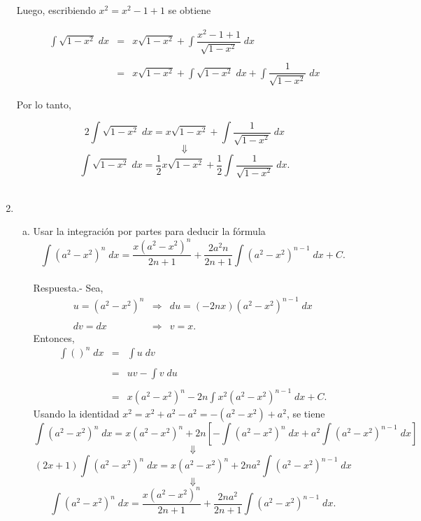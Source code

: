 \begin{enumerate}[\bfseries 1.]
	Luego, escribiendo $x^2=x^2-1+1$ se obtiene

	$$
	\begin{array}{rcl}
	    \displaystyle\int \sqrt{1-x^2}\; dx &=& x\sqrt{1-x^2} + \displaystyle\int \dfrac{x^2-1+1}{\sqrt{1-x^2}}\; dx\\\\
						&=& x\sqrt{1-x^2} + \displaystyle\int \sqrt{1-x^2}\; dx + \int \dfrac{1}{\sqrt{1-x^2}}\; dx
	\end{array}
	$$

	Por lo tanto,

	$$2\displaystyle\int \sqrt{1-x^2}\; dx = x\sqrt{1-x^2} + \int \dfrac{1}{\sqrt{1-x^2}}\; dx$$ 
	$$\Downarrow$$  
	$$\int \sqrt{1-x^2}\; dx = \dfrac{1}{2}x\sqrt{1-x^2}+\dfrac{1}{2}\int \dfrac{1}{\sqrt{1-x^2}}\; dx.$$\\

    \item 
	\begin{enumerate}[a)]

	    \item Usar la integración por partes para deducir la fórmula
	    $$\int \left(a^2-x^2\right)^n \; dx = \dfrac{x\left(a^2-x^2\right)^n}{2n+1}+\dfrac{2a^2n}{2n+1}\int \left(a^2-x^2\right)^{n-1}\; dx + C.$$\\
		Respuesta.-\; Sea,
		$$
		\begin{array}{rcl}
		    u=\left(a^2-x^2\right)^n &\Rightarrow& du=(-2nx)\left(a^2-x^2\right)^{n-1}\; dx\\\\
		    dv=dx &\Rightarrow& v=x.
		\end{array}
		$$
		Entonces,
		$$
		\begin{array}{rcl}
		    \displaystyle\int \left(\right)^n\; dx &=& \displaystyle\int u\; dv\\\\
							   &=& uv - \int v\; du\\\\
							   &=& x\left(a^2-x^2\right)^n - 2n\displaystyle\int x^2\left(a^2-x^2\right)^{n-1}\; dx+C.
		\end{array}
		$$
		Usando la identidad $x^2=x^2+a^2-a^2 = -\left(a^2-x^2\right)+a^2$, se tiene
		$$\int \left(a^2-x^2\right)^n\; dx = x\left(a^2-x^2\right)^n+2n\left[-\int \left(a^2-x^2\right)^n\; dx+a^2\int\left(a^2-x^2\right)^{n-1}\; dx\right]$$
		$$\Downarrow$$
		$$(2x+1)\int \left(a^2-x^2\right)^n\; dx = x\left(a^2-x^2\right)^n + 2na^2\int \left(a^2-x^2\right)^{n-1}\; dx$$
		$$\Downarrow$$
		$$\int \left(a^2-x^2\right)^n\; dx = \dfrac{x\left(a^2-x^2\right)^n}{2n+1}+\dfrac{2na^2}{2n+1}\int \left(a^2-x^2\right)^{n-1}\; dx.$$\\\\


\end{enumerate}
\end{enumerate}
